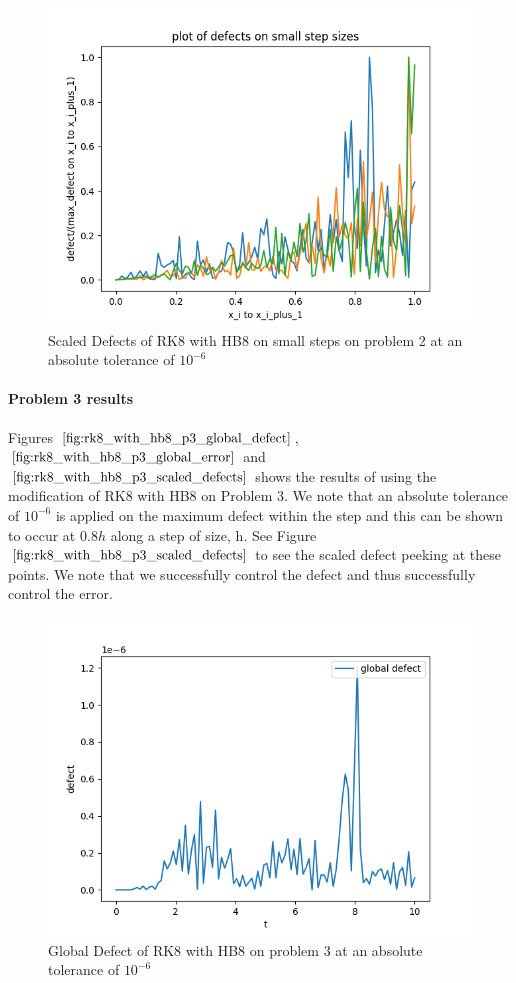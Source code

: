 \documentclass{article}
\begin{document}
\begin{figure}[H]
\centering
\includegraphics[width=0.7\linewidth]{./figures/rk8_with_hb8_p2_scaled_defects_small_steps}
\caption{Scaled Defects of RK8 with HB8 on small steps on problem 2 at an absolute tolerance of $10^{-6}$}
\label{fig:rk8_with_hb8_p2_scaled_defects_small_steps}
\end{figure}

\paragraph{Problem 3 results}
Figures $\ref{fig:rk8_with_hb8_p3_global_defect}$, $\ref{fig:rk8_with_hb8_p3_global_error}$ and $\ref{fig:rk8_with_hb8_p3_scaled_defects}$ shows the results of using the modification of RK8 with HB8 on Problem 3. 
We note that an absolute tolerance of $10^{-6}$ is applied on the maximum defect within the step and this can be shown to occur at $0.8h$ along a step of size, h. See Figure $\ref{fig:rk8_with_hb8_p3_scaled_defects}$ to see the scaled defect peeking at these points. We note that we successfully control the defect and thus successfully control the error.

\begin{figure}[H]
\centering
\includegraphics[width=0.7\linewidth]{./figures/rk8_with_hb8_p3_global_defect}
\caption{Global Defect of RK8 with HB8 on problem 3 at an absolute tolerance of $10^{-6}$}
\label{fig:rk8_with_hb8_p3_global_defect}
\end{figure}
\end{document}
